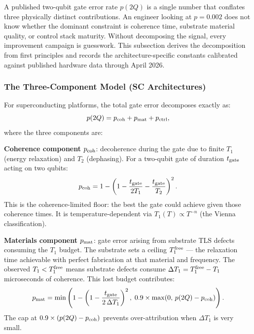 \documentclass[12pt,a4paper]{article}
\begin{document}
A published two-qubit gate error rate $p(2Q)$ is a single number that conflates
three physically distinct contributions. An engineer looking at $p = 0.002$ does
not know whether the dominant constraint is coherence time, substrate material
quality, or control stack maturity. Without decomposing the signal, every
improvement campaign is guesswork. This subsection derives the decomposition
from first principles and records the architecture-specific constants calibrated
against published hardware data through April 2026.

\subsubsection{The Three-Component Model (SC Architectures)}

For superconducting platforms, the total gate error decomposes exactly as:
\begin{equation}
p(2Q) = p_{\rm coh} + p_{\rm mat} + p_{\rm ctrl},
\label{eq:decomp}
\end{equation}
where the three components are:

\textbf{Coherence component} $p_{\rm coh}$: decoherence during the gate due to
finite $T_1$ (energy relaxation) and $T_2$ (dephasing). For a two-qubit gate
of duration $t_{\rm gate}$ acting on two qubits:
\begin{equation}
p_{\rm coh} = 1 - \left(1 - \frac{t_{\rm gate}}{2T_1} - \frac{t_{\rm gate}}{T_2}\right)^2.
\label{eq:p_coh}
\end{equation}
This is the coherence-limited floor: the best the gate could achieve given
those coherence times. It is temperature-dependent via $T_1(T) \propto T^{-n}$
(the Vienna classification).

\textbf{Materials component} $p_{\rm mat}$: gate error arising from substrate
TLS defects consuming the $T_1$ budget. The substrate sets a ceiling
$T_1^{\rm free}$ --- the relaxation time achievable with perfect fabrication
at that material and frequency. The observed $T_1 < T_1^{\rm free}$ means
substrate defects consume $\Delta T_1 = T_1^{\rm free} - T_1$ microseconds
of coherence. This lost budget contributes:
\begin{equation}
p_{\rm mat} = \min\left(1 - \left(1 - \frac{t_{\rm gate}}{2\,\Delta T_1}\right)^2,\;
              0.9\times\max(0,\, p(2Q) - p_{\rm coh})\right).
\label{eq:p_mat}
\end{equation}
The cap at $0.9\times(p(2Q)-p_{\rm coh})$ prevents over-attribution
when $\Delta T_1$ is very small.
\end{document}
